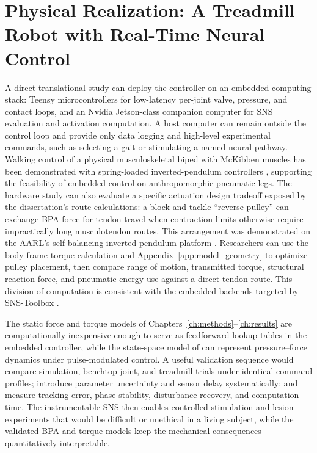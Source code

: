 \section{Physical Realization: A Treadmill Robot with Real-Time Neural Control}\label{sec:fw_hardware}

A direct translational study can deploy the controller on an embedded computing stack: Teensy microcontrollers for low-latency per-joint valve, pressure, and contact loops, and an Nvidia Jetson-class companion computer for SNS evaluation and activation computation. A host computer can remain outside the control loop and provide only data logging and high-level experimental commands, such as selecting a gait or stimulating a named neural pathway. Walking control of a physical musculoskeletal biped with McKibben muscles has been demonstrated with spring-loaded inverted-pendulum controllers \citep{li_controller_2024}, supporting the feasibility of embedded control on anthropomorphic pneumatic legs. The hardware study can also evaluate a specific actuation design tradeoff exposed by the dissertation's route calculations: a block-and-tackle ``reverse pulley'' can exchange BPA force for tendon travel when contraction limits otherwise require impractically long musculotendon routes. This arrangement was demonstrated on the AARL's self-balancing inverted-pendulum platform \citep{bolen_balance_2024, bolen_selfbalancing_2024, bolen_selfbalancing_srs_2024}. Researchers can use the body-frame torque calculation and Appendix~\ref{app:model_geometry} to optimize pulley placement, then compare range of motion, transmitted torque, structural reaction force, and pneumatic energy use against a direct tendon route. This division of computation is consistent with the embedded backends targeted by SNS-Toolbox \citep{nourse_sns_2023}.

The static force and torque models of Chapters~\ref{ch:methods}--\ref{ch:results} are computationally inexpensive enough to serve as feedforward lookup tables in the embedded controller, while the state-space model of \citet{elzein_pressure_2025} can represent pressure--force dynamics under pulse-modulated control. A useful validation sequence would compare simulation, benchtop joint, and treadmill trials under identical command profiles; introduce parameter uncertainty and sensor delay systematically; and measure tracking error, phase stability, disturbance recovery, and computation time. The instrumentable SNS then enables controlled stimulation and lesion experiments that would be difficult or unethical in a living subject, while the validated BPA and torque models keep the mechanical consequences quantitatively interpretable.

